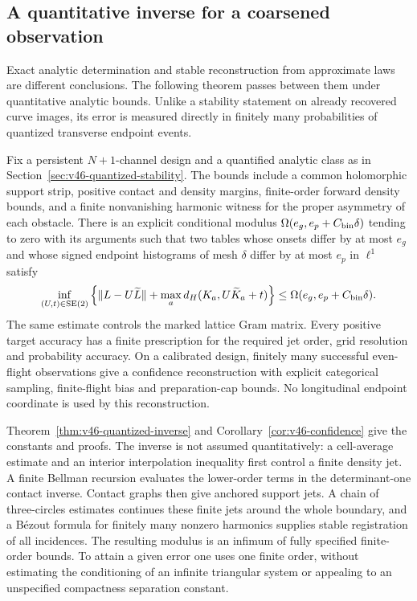 \subsection{A quantitative inverse for a coarsened observation}
\label{subsec:v46-intro-quantized}

Exact analytic determination and stable reconstruction from approximate laws
are different conclusions.  The following theorem passes between them under
quantitative analytic bounds.  Unlike a stability statement on already
recovered curve images, its error is measured directly in finitely many
probabilities of quantized transverse endpoint events.

\begin{theorem}
\label{thm:v46-intro-quantized}
Fix a persistent $N+1$-channel design and a quantified analytic class as in
Section~\ref{sec:v46-quantized-stability}.  The bounds include a common
holomorphic support strip, positive contact and density margins, finite-order
forward density bounds, and a finite nonvanishing harmonic witness for the
proper asymmetry of each obstacle.  There is an explicit conditional modulus
$\Omega(e_g,e_p+C_{\rm bin}\delta)$ tending to zero with its arguments such
that two tables whose onsets differ by at most $e_g$ and whose signed endpoint
histograms of mesh $\delta$ differ by at most $e_p$ in $\ell^1$ satisfy
\[
 \inf_{(U,t)\in\mathrm{SE}(2)}
 \left\{\|L-U\widetilde L\|+
 \max_a d_H(K_a,U\widetilde K_a+t)\right\}
 \le\Omega(e_g,e_p+C_{\rm bin}\delta).
\]
The same estimate controls the marked lattice Gram matrix.  Every positive
target accuracy has a finite prescription for the required jet order, grid
resolution and probability accuracy.  On a calibrated design, finitely many
successful even-flight observations give a confidence reconstruction with
explicit categorical sampling, finite-flight bias and preparation-cap bounds.
No longitudinal endpoint coordinate is used by this reconstruction.
\end{theorem}

Theorem~\ref{thm:v46-quantized-inverse} and
Corollary~\ref{cor:v46-confidence} give the constants and proofs.  The inverse
is not assumed quantitatively: a cell-average estimate and an interior
interpolation inequality first control a finite density jet.  A finite Bellman
recursion evaluates the lower-order terms in the determinant-one contact
inverse.  Contact graphs then give anchored support jets.  A chain of
three-circles estimates continues these finite jets around the whole boundary,
and a B\'ezout formula for finitely many nonzero harmonics supplies stable
registration of all incidences.  The resulting modulus is an infimum of
fully specified finite-order bounds.  To attain a given error one uses one
finite order, without estimating the conditioning of an infinite triangular
system or appealing to an unspecified compactness separation constant.

